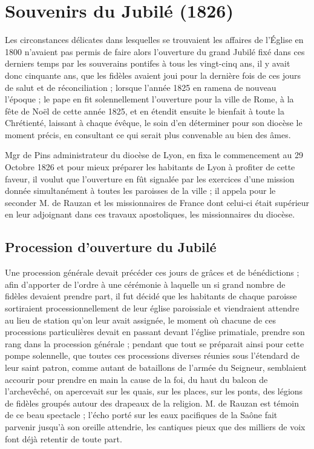 \documentclass[11pt,a4paper]{report}
\begin{document}
\chapter{Souvenirs du Jubilé (1826)}

Les circonstances délicates dans lesquelles se trouvaient les affaires de l'Église en 1800 n'avaient pas permis de faire alors l'ouverture du grand Jubilé fixé dans ces derniers temps par les souverains pontifes à tous les vingt-cinq ans, il y avait donc cinquante ans, que les fidèles avaient joui pour la dernière fois de ces jours de salut et de réconciliation ; lorsque l'année 1825 en ramena de nouveau l'époque ; le pape en fit solennellement l'ouverture pour la ville de Rome, à la fête de Noël de cette année 1825, et en étendit ensuite le bienfait à toute la Chrétienté, laissant à chaque évêque, le soin d'en déterminer pour son diocèse le moment précis, en consultant ce qui serait plus convenable au bien des âmes.

Mgr de Pins administrateur du diocèse de Lyon, en fixa le commencement au 29 Octobre 1826 et pour mieux préparer les habitants de Lyon à profiter de cette faveur, il voulut que l'ouverture en fût signalée par les exercices d'une mission donnée simultanément à toutes les paroisses de la ville ; il appela pour le seconder M. de Rauzan et les missionnaires de France dont celui-ci était supérieur en leur adjoignant dans ces travaux apostoliques, les missionnaires du diocèse.

\section*{Procession d'ouverture du Jubilé}

Une procession générale devait précéder ces jours de grâces et de bénédictions ; afin d'apporter de l'ordre à une cérémonie à laquelle un si grand nombre de fidèles devaient prendre part, il fut décidé que les habitants de chaque paroisse sortiraient processionnellement de leur église paroissiale et viendraient attendre au lieu de station qu'on leur avait assignée, le moment où chacune de ces processions particulières devait en passant devant l'église primatiale, prendre son rang dans la procession générale ; pendant que tout se préparait ainsi pour cette pompe solennelle, que toutes ces processions diverses réunies sous l'étendard de leur saint patron, comme autant de bataillons de l'armée du Seigneur, semblaient accourir pour prendre en main la cause de la foi, du haut du balcon de l'archevêché, on apercevait sur les quais, sur les places, sur les ponts, des légions de fidèles groupés autour des drapeaux de la religion. M. de Rauzan est témoin de ce beau spectacle ; l'écho porté sur les eaux pacifiques de la Saône fait parvenir jusqu'à son oreille attendrie, les cantiques pieux que des milliers de voix font déjà retentir de toute part.
\end{document}
